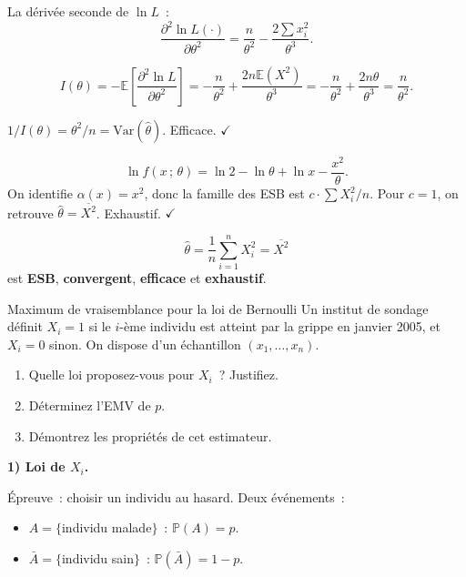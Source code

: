 \documentclass[11pt,a4paper]{article}
\newcommand{\E}{\mathbb{E}}
\newcommand{\Var}{\mathrm{Var}}
\newcommand{\Prob}{\mathbb{P}}
\renewcommand{\P}{\Prob}
\newcommand{\corrsep}{\vspace{4pt}{\color{rulecol}\hrule height 0.6pt}\vspace{6pt}}
\begin{document}
\begin{demobox}[(d) Efficacit\'e]
La d\'eriv\'ee seconde de $\ln L$~:
$$\frac{\partial^2\ln L(\cdot)}{\partial\theta^2}
  = \frac{n}{\theta^2} - \frac{2\sum x_i^2}{\theta^3}.$$

$$I(\theta) = -\E\!\left[\frac{\partial^2\ln L}{\partial\theta^2}\right]
  = -\frac{n}{\theta^2}+\frac{2n\E(X^2)}{\theta^3}
  = -\frac{n}{\theta^2}+\frac{2n\theta}{\theta^3}
  = \frac{n}{\theta^2}.$$

$1/I(\theta) = \theta^2/n = \Var(\hat\theta)$. Efficace. $\checkmark$
\end{demobox}

\begin{demobox}[(e) Exhaustivit\'e]
$$\ln f(x\,;\,\theta)=\ln 2-\ln\theta+\ln x-\frac{x^2}{\theta}.$$
On identifie $\alpha(x)=x^2$, donc la famille des ESB est $c\cdot\sum X_i^2/n$.
Pour $c=1$, on retrouve $\hat\theta=\overline{X^2}$. Exhaustif. $\checkmark$
\end{demobox}

\begin{methbox}
$$\boxed{\hat\theta = \frac{1}{n}\sum_{i=1}^n X_i^2 = \overline{X^2}}$$
est \textbf{ESB}, \textbf{convergent}, \textbf{efficace} et \textbf{exhaustif}.
\end{methbox}

\begin{exercice}{Maximum de vraisemblance pour la loi de Bernoulli}
Un institut de sondage d\'efinit $X_i = 1$ si le $i$-\`eme individu est atteint par la grippe
en janvier 2005, et $X_i=0$ sinon. On dispose d'un \'echantillon $(x_1,\ldots,x_n)$.

\begin{enumerate}[label=\textbf{\arabic*)}]
  \item Quelle loi proposez-vous pour $X_i$~? Justifiez.
  \item D\'eterminez l'EMV de $p$.
  \item D\'emontrez les propri\'et\'es de cet estimateur.
\end{enumerate}
\end{exercice}

\corrsep

\textbf{1) Loi de $X_i$.}

\'Epreuve~: choisir un individu au hasard. Deux \'ev\'enements~:
\begin{itemize}
  \item $A=\{$individu malade$\}$~: $\P(A)=p$.
  \item $\bar A=\{$individu sain$\}$~: $\P(\bar A)=1-p$.
\end{itemize}
\end{document}
